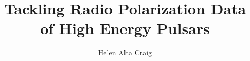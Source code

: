 \documentclass[12pt]{report}
\title{Tackling Radio Polarization Data of High Energy Pulsars}
\author{Helen Alta Craig}
\begin{document}
 


 \beforepreface





 \afterpreface













\appendix



% 
% 

\end{document}
